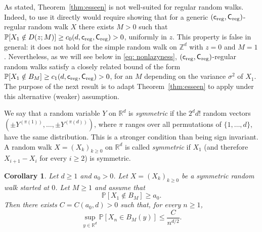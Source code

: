 \documentclass[11pt,a4paper]{article}
\numberwithin{equation}{section}
\theoremstyle{plain}
\newtheorem{Coro}[Thm]{Corollary}
\theoremstyle{definition}
\newcommand\1{\mathds{1}}
\newcommand\creg{\mathsf{c}_{\textup{reg}}}
\newcommand\Creg{\mathsf{C}_{\textup{reg}}}
\begin{document}
As stated, Theorem~\ref{thm:esseen} is not well-suited for regular random walks. Indeed, to use it directly would require showing that for a generic $(\creg,\Creg)$-regular random walk $X$ there exists $M>0$ such that $\mathbb P[X_1\notin D(z;M)]\geq c_0(d,\creg,\Creg)>0$, uniformly in $z$. This property is false in general: it does not hold for the simple random walk on $\mathbb Z^d$ with $z=0$ and $M=1$. Nevertheless, as we will see below in \eqref{eq: nonlazyness}, $(\creg,\Creg)$-regular random walks satisfy a closely related bound of the form $\mathbb P[X_1\notin B_M]\geq c_1(d,\creg,\Creg)>0$, for an $M$ depending on the variance $\sigma^2$ of $X_1$. The purpose of the next result is
to adapt Theorem~\ref{thm:esseen} to apply under this alternative (weaker) assumption.


We say that a random variable $Y$ on $\mathbb R^d$ is \emph{symmetric} if
the $2^d d!$
random vectors $(\pm Y^{(\pi(1))},\ldots,\pm Y^{(\pi(d))})$, where $\pi$ ranges over all permutations of $\{1,\ldots,d\}$, have the same distribution. This is a stronger condition than being sign invariant. A random walk $X=(X_k)_{k\geq 0}$ on $\mathbb R^d$ is called \emph{symmetric} if $X_1$ (and therefore $X_{i+1}-X_i$ for every $i\geq 2$) is symmetric.


\begin{Coro}\label{cor: coro of esseen} Let $d\geq 1$ and $a_0>0$.
Let $X=(X_k)_{k\geq 0}$ be a symmetric random walk started at $0$. Let $M\geq 1$ and assume that
\begin{equation}
	\mathbb P[X_1\notin B_M]\geq a_0.
\end{equation}
Then there exists $C=C(a_0,d)>0$ such that, for every $n\geq 1$,
\begin{equation}\label{eq:target esseen}
	\sup_{y\in \mathbb R^d}\mathbb P[X_n\in B_M(y)]\leq \frac{C}{n^{d/2}}.
\end{equation}
\end{Coro}
\end{document}
